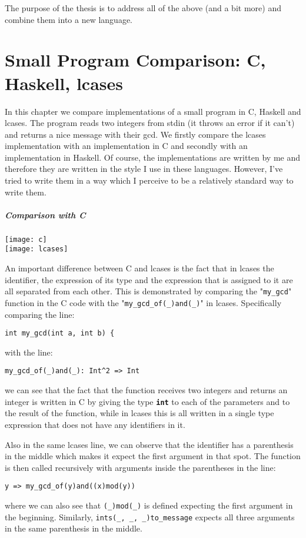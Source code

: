 \documentclass[diploma]{softlab-thesis}
\def\H{Haskell}
\begin{document}
The purpose of the thesis is to address all of the above (and a bit more) and
combine them into a new language.

\chapter{Small Program Comparison: C, Haskell, lcases}

In this chapter we compare implementations of a small program in C, Haskell and
lcases. The program reads two integers from stdin (it throws an error if it
can't) and returns a nice message with their gcd. We firstly compare the lcases
implementation with an implementation in C and secondly with an implementation
in \H.  Of course, the implementations are written by me and therefore they are
written in the style I use in these languages.  However, I've tried to write
them in a way which I perceive to be a relatively standard way to write them.

\paragraph{Comparison with C}

\begin{center}
\texttt{[image: c]}\\
\vspace{0.2cm}
\texttt{[image: lcases]}
\end{center}
\newpage

An important difference between C and lcases is the fact that in lcases the
identifier, the expression of its type and the expression that is assigned to
it are all separated from each other. This is demonstrated by comparing the
"\verb|my_gcd|" function in the C code with the "\verb|my_gcd_of(_)and(_)|" in
lcases. Specifically comparing the line:
\begin{verbatim}
int my_gcd(int a, int b) {
\end{verbatim}
with the line:
\begin{verbatim}
my_gcd_of(_)and(_): Int^2 => Int
\end{verbatim}
we can see that the fact that the function receives two integers and returns an
integer is written in C by giving the type \textbf{\texttt{int}} to each of the
parameters and to the result of the function, while in lcases this is all
written in a single type expression that does not have any identifiers in it.

Also in the same lcases line, we can observe that the identifier has a
parenthesis in the middle which makes it expect the first argument in that
spot. The function is then called recursively with arguments inside the
parentheses in the line:
\begin{verbatim}
y => my_gcd_of(y)and((x)mod(y))
\end{verbatim}
where we can also see that \verb|(_)mod(_)| is defined expecting the first
argument in the beginning. Similarly, \verb|ints(_, _, _)to_message| expects
all three arguments in the same parenthesis in the middle.
\end{document}
